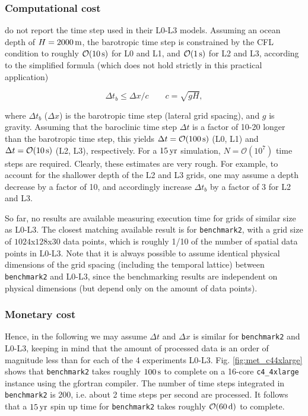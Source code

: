 \documentclass[12pt,a4paper]{article}
\begin{document}
\subsubsection{Computational cost}

\cite{kumar2015midshelf} do not report the time step used in their L0-L3 models. Assuming an ocean depth of $H=2000\,\rm m$, the barotropic time step is constrained by the CFL condition to roughly $\mathcal{O}(10\,\rm s)$ for L0 and L1, and $\mathcal{O}(1\,\rm s)$ for L2 and L3, according to the simplified formula (which does not hold strictly in this practical application)

\begin{equation}
\Delta t_{b}\leq\Delta x/c \qquad c=\sqrt{gH},
\end{equation}

where $\Delta t_b$ ($\Delta x$) is the barotropic time step (lateral grid spacing), and $g$ is gravity. Assuming that the baroclinic time step $\Delta t$ is a factor of 10-20 longer than the barotropic time step, this yields $\Delta t=\mathcal{O}(100\,\rm s)$ (L0, L1) and $\Delta t= \mathcal{O}(10\,\rm s)$ (L2, L3), respectively. For a $15\,\rm yr$ simulation, $N=\mathcal{O}(10^7)$ time steps are required. Clearly, these estimates are very rough. For example, to account for the shallower depth of the L2 and L3 grids,  one may assume a depth decrease by a factor of 10, and accordingly increase $\Delta t_b$ by a factor of 3 for L2 and L3. 

So far, no results are available measuring execution time for grids of similar size as L0-L3. The closest matching available result is for \verb|benchmark2|, with a grid size of $1024$x$128$x$30$ data points, which is roughly 1/10 of the number of spatial data points in L0-L3. Note that it is always possible to assume identical physical dimensions of the grid spacing (including the temporal lattice) between \verb|benchmark2| and L0-L3, since the benchmarking results are independent on physical dimensions (but depend only on the amount of data points).


\subsubsection{Monetary cost}

Hence, in the following we may assume $\Delta t$ and $\Delta x$ is similar for \verb|benchmark2| and L0-L3, keeping in mind that the amount of processed data is an order of magnitude less than for each of the 4 experiments L0-L3.
Fig. \ref{fig:met_c44xlarge} shows that \verb|benchmark2| takes roughly $100\,\rm s$ to complete on a 16-core \verb|c4_4xlarge| instance using the gfortran compiler. The number of time steps integrated in  \verb|benchmark2| is 200, i.e. about 2 time steps per second are processed. It follows that a $15\,\rm yr$ spin up time for \verb|benchmark2| takes roughly $\mathcal{O}(60\,\rm d)$ to complete.
\end{document}

